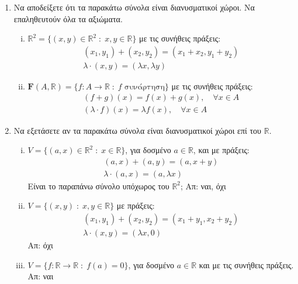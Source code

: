 \begin{enumerate}
    \item Να αποδείξετε ότι τα παρακάτω σύνολα είναι διανυσματικοί χώροι. Να 
        επαληθευτούν όλα τα αξιώματα.
        \begin{enumerate}[i)]
            \item $ \mathbb{R}^{2} = \{(x,y)\in \mathbb{R}^{2} 
                \; : \; x,y \in \mathbb{R} \} $ με τις συνήθεις πράξεις:
                \begin{gather*}
                    (x_{1}, y_{1}) + (x_{2}, y_{2}) = (x_{1}+ x_{2}, y_{1}+ y_{2}) \\
                    \lambda \cdot (x,y) = (\lambda x, \lambda y)
                \end{gather*}

            \item $ \mathbf{F}(A, \mathbb{R}) = \{ f \colon A \to \mathbb{R} 
                \; : \; f \; \text{συνάρτηση} \} $ με τις συνήθεις πράξεις:
                \begin{gather*}
                    (f+g)(x) = f(x)+g(x), \quad \forall x \in A \\
                    (\lambda  \cdot f)(x) = \lambda f(x), \quad \forall x \in A
                \end{gather*} 
        \end{enumerate}

    \item Να εξετάσετε αν τα παρακάτω σύνολα είναι διανυσματικοί χώροι επί του 
        $\mathbb{R}$.
        \begin{enumerate}[i)]
            \item $ V = \{ (a,x) \in \mathbb{R}^{2} \; : \; x \in \mathbb{R} \} $, 
                για δοσμένο $ a \in \mathbb{R} $, και με πράξεις: 
                \begin{gather*}
                    (a,x) + (a,y) = (a,x+y) \\
                    \lambda \cdot (a,x) = (a, \lambda x)
                \end{gather*}
                Είναι το παραπάνω σύνολο υπόχωρος του $ \mathbb{R}^{2} $;
                \hfill Απ: ναι, όχι 
            \item $ V = \{(x,y) \; : \; x,y \in \mathbb{R} \} $ με πράξεις: 
                \begin{gather*}
                    (x_{1}, y_{1}) + (x_{2}, y_{2}) = (x_{1}+ y_{1}, x_{2}+ y_{2}) \\
                    \lambda \cdot (x,y) = (\lambda x, 0) 
                \end{gather*} 
                \hfill Απ: όχι 
            \item $ V = \{ f \colon \mathbb{R} \to \mathbb{R} \; : \; f(a) = 0 \} $, 
                για δοσμένο $ a \in \mathbb{R} $ και με τις συνήθεις πράξεις. 
                \hfill Απ: ναι 
        \end{enumerate}


\end{enumerate}
